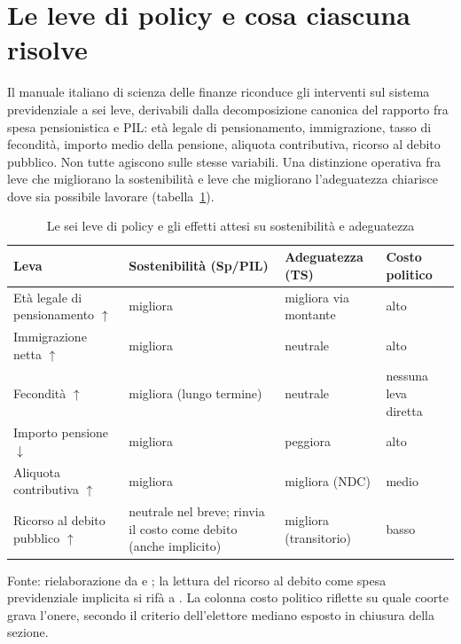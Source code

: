 \section{Le leve di policy e cosa ciascuna risolve}
\label{sec:leve}

\noindent
Il manuale italiano di scienza delle finanze \cite{Bosi2018, BosiGuerra2022,
RosenGayerRapallini2023} riconduce gli interventi sul sistema previdenziale
a sei leve, derivabili dalla decomposizione canonica del rapporto fra spesa
pensionistica e PIL: età legale di pensionamento, immigrazione, tasso di
fecondità, importo medio della pensione, aliquota contributiva, ricorso al
debito pubblico. Non tutte agiscono sulle stesse variabili. Una distinzione
operativa fra leve che migliorano la sostenibilità e leve che migliorano
l'adeguatezza chiarisce dove sia possibile lavorare (tabella~\ref{tab:leve}).

\begin{table}[h!]
\centering
\small
\renewcommand{\arraystretch}{1.35}
\caption{Le sei leve di policy e gli effetti attesi su sostenibilità e
         adeguatezza}
\label{tab:leve}
\begin{tabularx}{\textwidth}{X p{} p{} p{}}
\toprule
\textbf{Leva} & \textbf{Sostenibilità (Sp/PIL)} & \textbf{Adeguatezza (TS)}
              & \textbf{Costo politico} \\
\midrule
Età legale di pensionamento $\uparrow$ & migliora & migliora via montante & alto \\
\midrule
Immigrazione netta $\uparrow$ & migliora & neutrale & alto \\
\midrule
Fecondità $\uparrow$ & migliora (lungo termine) & neutrale & nessuna leva diretta \\
\midrule
Importo pensione $\downarrow$ & migliora & peggiora & alto \\
\midrule
Aliquota contributiva $\uparrow$ & migliora & migliora (NDC) & medio \\
\midrule
Ricorso al debito pubblico $\uparrow$ & neutrale nel breve; rinvia il costo come debito (anche implicito) & migliora (transitorio) & basso \\
\bottomrule
\end{tabularx}
\par\smallskip
\footnotesize Fonte: rielaborazione da \cite{Bosi2018} e
\cite{RosenGayerRapallini2023}; la lettura del ricorso al debito come spesa
previdenziale implicita si rifà a \cite{Fornero2018}. La colonna costo politico
riflette su quale coorte grava l'onere, secondo il criterio dell'elettore
mediano esposto in chiusura della sezione.
\end{table}

